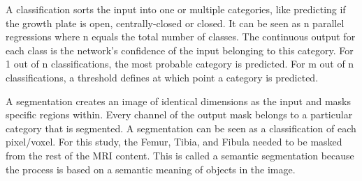 A classification sorts the input into one or multiple categories, like predicting if the growth plate is open, centrally-closed or closed. It can be seen as n parallel regressions where n equals the total number of classes. The continuous output for each class is the network's confidence of the input belonging to this category. For 1 out of n classifications, the most probable category is predicted. For m out of n classifications, a threshold defines at which point a category is predicted.

A segmentation creates an image of identical dimensions as the input and masks specific regions within. Every channel of the output mask belongs to a particular category that is segmented. A segmentation can be seen as a classification of each pixel/voxel. For this study, the Femur, Tibia, and Fibula needed to be masked from the rest of the MRI content. This is called a semantic segmentation because the process is based on a semantic meaning of objects in the image.

